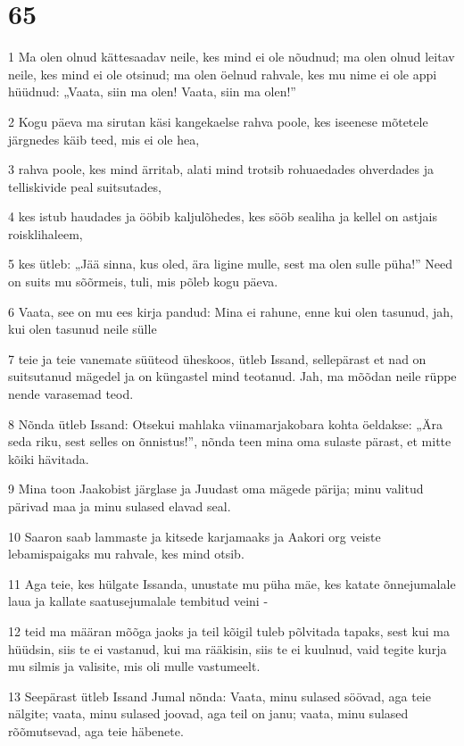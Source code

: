 \chapter{65}

\par 1 Ma olen olnud kättesaadav neile, kes mind ei ole nõudnud; ma olen olnud leitav neile, kes mind ei ole otsinud; ma olen öelnud rahvale, kes mu nime ei ole appi hüüdnud: „Vaata, siin ma olen! Vaata, siin ma olen!”
\par 2 Kogu päeva ma sirutan käsi kangekaelse rahva poole, kes iseenese mõtetele järgnedes käib teed, mis ei ole hea,
\par 3 rahva poole, kes mind ärritab, alati mind trotsib rohuaedades ohverdades ja telliskivide peal suitsutades,
\par 4 kes istub haudades ja ööbib kaljulõhedes, kes sööb sealiha ja kellel on astjais roisklihaleem,
\par 5 kes ütleb: „Jää sinna, kus oled, ära ligine mulle, sest ma olen sulle püha!” Need on suits mu sõõrmeis, tuli, mis põleb kogu päeva.
\par 6 Vaata, see on mu ees kirja pandud: Mina ei rahune, enne kui olen tasunud, jah, kui olen tasunud neile sülle
\par 7 teie ja teie vanemate süüteod üheskoos, ütleb Issand, sellepärast et nad on suitsutanud mägedel ja on küngastel mind teotanud. Jah, ma mõõdan neile rüppe nende varasemad teod.
\par 8 Nõnda ütleb Issand: Otsekui mahlaka viinamarjakobara kohta öeldakse: „Ära seda riku, sest selles on õnnistus!”, nõnda teen mina oma sulaste pärast, et mitte kõiki hävitada.
\par 9 Mina toon Jaakobist järglase ja Juudast oma mägede pärija; minu valitud pärivad maa ja minu sulased elavad seal.
\par 10 Saaron saab lammaste ja kitsede karjamaaks ja Aakori org veiste lebamispaigaks mu rahvale, kes mind otsib.
\par 11 Aga teie, kes hülgate Issanda, unustate mu püha mäe, kes katate õnnejumalale laua ja kallate saatusejumalale tembitud veini -
\par 12 teid ma määran mõõga jaoks ja teil kõigil tuleb põlvitada tapaks, sest kui ma hüüdsin, siis te ei vastanud, kui ma rääkisin, siis te ei kuulnud, vaid tegite kurja mu silmis ja valisite, mis oli mulle vastumeelt.
\par 13 Seepärast ütleb Issand Jumal nõnda: Vaata, minu sulased söövad, aga teie nälgite; vaata, minu sulased joovad, aga teil on janu; vaata, minu sulased rõõmutsevad, aga teie häbenete.
